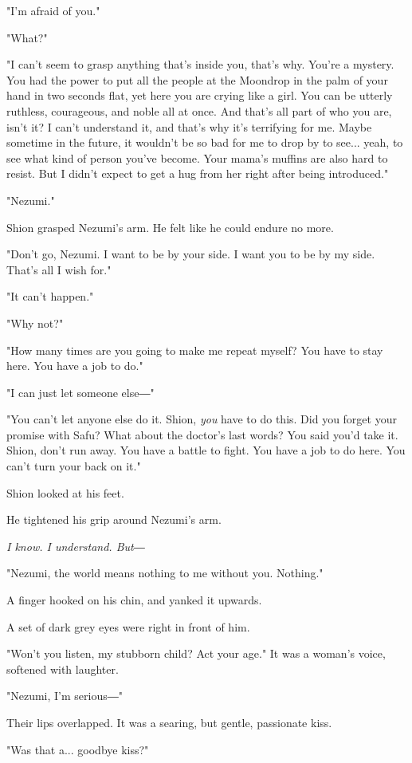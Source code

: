 "I'm afraid of you."

"What?"

"I can't seem to grasp anything that's inside you, that's why. You're a
mystery. You had the power to put all the people at the Moondrop in the
palm of your hand in two seconds flat, yet here you are crying like a
girl. You can be utterly ruthless, courageous, and noble all at once.
And that's all part of who you are, isn't it? I can't understand it, and
that's why it's terrifying for me. Maybe sometime in the future, it
wouldn't be so bad for me to drop by to see... yeah, to see what kind of
person you've become. Your mama's muffins are also hard to resist. But I
didn't expect to get a hug from her right after being introduced."

"Nezumi."

Shion grasped Nezumi's arm. He felt like he could endure no more.

"Don't go, Nezumi. I want to be by your side. I want you to be by my
side. That's all I wish for."

"It can't happen."

"Why not?"

"How many times are you going to make me repeat myself? You have to stay
here. You have a job to do."

"I can just let someone else―"

"You can't let anyone else do it. Shion, \emph{you} have to do this. Did you
forget your promise with Safu? What about the doctor's last words? You
said you'd take it. Shion, don't run away. You have a battle to fight.
You have a job to do here. You can't turn your back on it."

Shion looked at his feet.

He tightened his grip around Nezumi's arm.

\emph{I know. I understand. But―}

"Nezumi, the world means nothing to me without you. Nothing."

A finger hooked on his chin, and yanked it upwards.

A set of dark grey eyes were right in front of him.

"Won't you listen, my stubborn child? Act your age." It was a woman's
voice, softened with laughter.

"Nezumi, I'm serious―"

Their lips overlapped. It was a searing, but gentle, passionate kiss.

"Was that a... goodbye kiss?"

